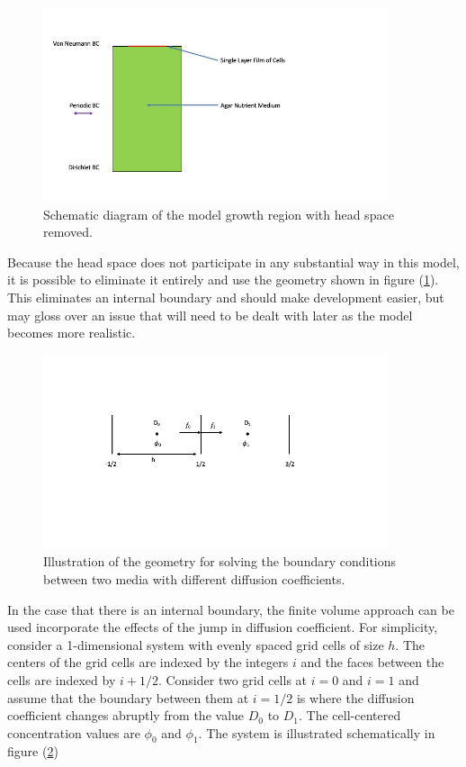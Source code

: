 \documentclass[12pt]{article}
\begin{document}
\begin{figure}
\centering
\includegraphics[width=4.0in,keepaspectratio=true]{ReducedSys}
\caption{\label{reducedsys} Schematic diagram of the model growth region with
head space removed.}
\end{figure}
Because the head space does not participate in any substantial way in this
model, it is possible to eliminate it entirely and use the geometry shown in
figure (\ref{reducedsys}). This eliminates an internal boundary and should make
development easier, but may gloss over an issue that will need to be dealt with
later as the model becomes more realistic.

\begin{figure}
\centering
\includegraphics[width=4.0in,keepaspectratio=true]{DiffBC}
\caption{\label{diffbc} Illustration of the geometry for solving the boundary
conditions between two media with different diffusion coefficients.}
\end{figure}
In the case that there is an internal boundary, the finite volume approach can
be used incorporate the effects of the jump in diffusion coefficient. For
simplicity, consider a 1-dimensional system with evenly spaced grid cells of
size $h$. The centers of the grid cells are indexed by the integers $i$ and the
faces between the cells are indexed by $i+1/2$. Consider two grid cells at $i=0$
and $i=1$ and assume that the boundary between them at $i=1/2$ is where the
diffusion coefficient changes abruptly from the value $D_0$ to $D_1$. The
cell-centered concentration values are $\phi_0$ and $\phi_1$. The system is
illustrated schematically in figure (\ref{diffbc})
\end{document}
